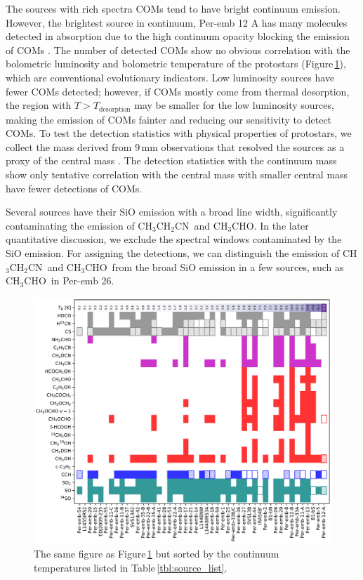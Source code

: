\documentclass[twocolumn]{aastex62}
\newcommand{\acetaldehyde}{\mbox{CH$_{3}$CHO}}
\newcommand{\ethylcyanide}{\mbox{CH$_{3}$CH$_{2}$CN}}
\begin{document}
The sources with rich spectra COMs tend to have bright continuum emission.  However, the brightest source in continuum, Per-emb 12 A has many molecules detected in absorption due to the high continuum opacity blocking the emission of COMs \citep{2019ApJ...872..196S}.  The number of detected COMs show no obvious correlation with the bolometric luminosity and bolometric temperature of the protostars (Figure\,\ref{fig:stats}), which are conventional evolutionary indicators.  Low luminosity sources have fewer COMs detected; however, if COMs mostly come from thermal desorption, the region with $T > T_\text{desorption}$ may be smaller for the low luminosity sources, making the emission of COMs fainter and reducing our sensitivity to detect COMs.  To test the detection statistics with physical properties of protostars, we collect the mass derived from 9\,mm observations that resolved the sources as a proxy of the central mass \citep{2018ApJS..238...19T}.  The detection statistics with the continuum mass show only tentative correlation with the central mass with smaller central mass have fewer detections of COMs.

Several sources have their SiO emission with a broad line width, significantly contaminating the emission of \ethylcyanide\ and \acetaldehyde.  In the later quantitative discussion, we exclude the spectral windows contaminated by the SiO emission.  For assigning the detections, we can distinguish the emission of \ethylcyanide\ and \acetaldehyde\ from the broad SiO emission in a few sources, such as \acetaldehyde\ in Per-emb 26.

\begin{figure}[htbp!]
  \includegraphics[width=\textwidth]{stats_sorted_by_Tcont.pdf}
  \caption{The same figure as Figure\,\ref{fig:stats} but sorted by the continuum temperatures listed in Table\,\ref{tbl:source_list}.}
  \label{fig:stats}
\end{figure}
\end{document}
